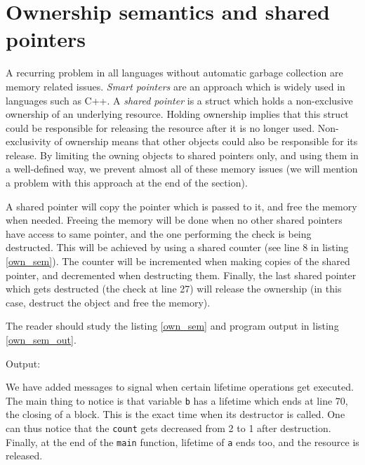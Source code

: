 \documentclass[times, utf8, diplomski]{fer}
\theoremstyle{definition}
\newcommand{\textcode}[3]{
    
}
\begin{document}
\textcode{\resdir/programs/string_mgmt.agt}{string_cl}{String class}
\textcode{\resdir/programs/string_mgmt.out}{string_cl_out}{String class - output}

\section{Ownership semantics and shared pointers}

A recurring problem in all languages without automatic garbage collection are
memory related issues.  \textit{Smart pointers} are an approach which is widely
used in languages such as C++.  A \textit{shared pointer}
is a struct which holds a non-exclusive ownership of an underlying resource.
Holding ownership implies that this struct could be responsible for releasing
the resource after it is no longer used. Non-exclusivity of ownership means
that other objects could also be responsible for its release. By limiting the
owning objects to shared pointers only, and using them in a well-defined way,
we prevent almost all of these memory issues (we will mention a problem with
this approach at the end of the section).

A shared pointer will copy the pointer which is passed to it, and free the memory when needed. 
Freeing the memory will be done when no other shared pointers have access to same pointer,
and the one performing the check is being destructed.
This will be achieved by using a shared counter (see line 8 in listing \ref{own_sem}).
The counter will be incremented when making copies of the shared pointer,
and decremented when destructing them.
Finally, the last shared pointer which gets destructed (the check at line 27) will release
the ownership (in this case, destruct the object and free the memory).

The reader should study the listing \ref{own_sem} and program output in listing \ref{own_sem_out}.

\textcode{\resdir/programs/shared_pointer.agt}{own_sem}{Shared pointer}

Output:
\textcode{\resdir/programs/shared_pointer.out}{own_sem_out}{Shared pointer - output}

We have added messages to signal when certain lifetime operations get executed.
The main thing to notice is that variable \texttt{b} has a lifetime which ends
at line 70, the closing of a block. This is the exact time when its destructor is called.
One can thus notice that the \texttt{count} gets decreased from 2 to 1 after destruction.
Finally, at the end of the \texttt{main} function, lifetime of \texttt{a} ends too,
and the resource is released.
\end{document}
